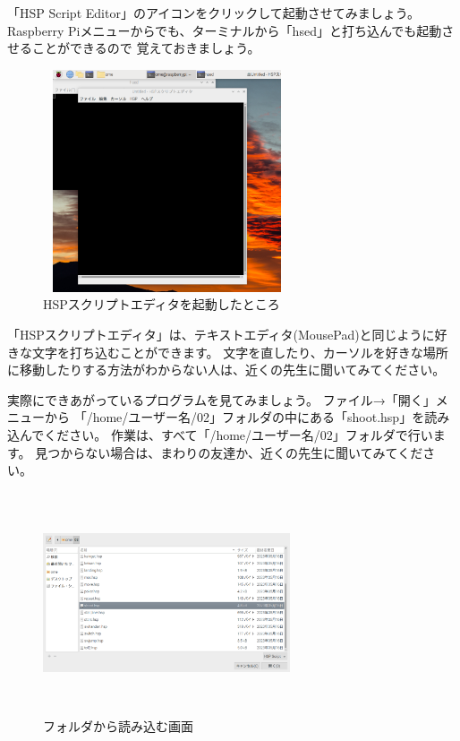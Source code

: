 「HSP Script Editor」のアイコンをクリックして起動させてみましょう。
Raspberry Piメニューからでも、ターミナルから「hsed」と打ち込んでも起動させることができるので
覚えておきましょう。

\begin{figure}[H]
  \begin{center}
    \includegraphics[keepaspectratio,width=7.31cm,height=6.562cm]{images/chap02/s_hsed.png}
    \caption{HSPスクリプトエディタを起動したところ}
  \end{center}
  \label{fig:hsed_start}
\end{figure}

「HSPスクリプトエディタ」は、テキストエディタ(MousePad)と同じように好きな文字を打ち込むことができます。
文字を直したり、カーソルを好きな場所に移動したりする方法がわからない人は、近くの先生に聞いてみてください。

実際にできあがっているプログラムを見てみましょう。
ファイル→「開く」メニューから 「/home/ユーザー名/02」フォルダの中にある「shoot.hsp」を読み込んでください。
作業は、すべて「/home/ユーザー名/02」フォルダで行います。
見つからない場合は、まわりの友達か、近くの先生に聞いてみてください。

\begin{figure}[H]
  \begin{center}
    \includegraphics[keepaspectratio,width=7.31cm,height=6.562cm]{images/chap02/s_openfolder.png}
    \caption{フォルダから読み込む画面}
  \end{center}
  \label{fig:hsed_openfolder}
\end{figure}

